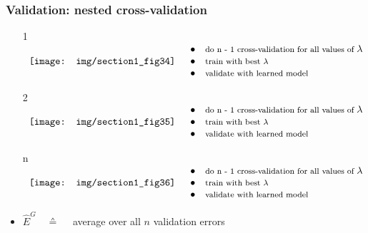 \newpage
\begin{frame}\frametitle{Validation: nested cross-validation}
	\begin{itemize}
	\item[\textcircled{1}]
	$ \begin{array}{ll}
		\texttt{[image: img/section1\_fig34]}
		& \begin{array}{ll}
			\bullet & \text{\footnotesize do n - 1 
				cross-validation for all values of } \lambda \\
			\bullet & \text{\footnotesize train with best $\lambda$} \\
			\bullet & \text{\footnotesize validate with learned model}
		\end{array}
	\end{array} $
	\item[\textcircled{2}]
	$ \begin{array}{ll}
		\texttt{[image: img/section1\_fig35]}
		& \begin{array}{ll}
			\bullet & \text{\footnotesize do n - 1 
				cross-validation for all values of } \lambda \\
			\bullet & \text{\footnotesize train with best $\lambda$} \\
			\bullet & \text{\footnotesize validate with learned model}
		\end{array}
	\end{array} $
	\item[\textcircled{n}]
	$ \begin{array}{ll}
		\texttt{[image: img/section1\_fig36]}
		& \begin{array}{ll}
			\bullet & \text{\footnotesize do n - 1
				cross-validation for all values of } \lambda \\
			\bullet & \text{\footnotesize train with best $\lambda$} \\
			\bullet & \text{\footnotesize validate with learned model}
		\end{array}
	\end{array} $
	\end{itemize}
	
	\begin{itemize}
		\item $\widehat{E}^G \quad\corresponds\quad$ 
			average over all $n$ validation errors
	\end{itemize}
\end{frame}


